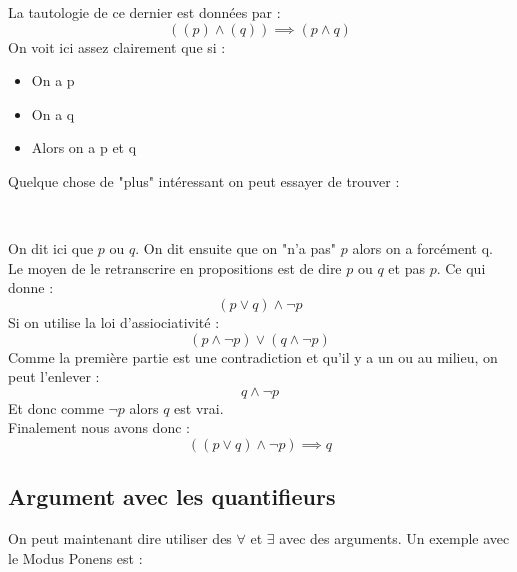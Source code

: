 La tautologie de ce dernier est données par :
\begin{equation*}
    ((p)\wedge(q)) \implies (p\wedge q)
\end{equation*}
On voit ici assez clairement que si :
\begin{itemize}
    \item On a p
    \item On a q
    \item Alors on a p et q
\end{itemize}

Quelque chose de "plus" intéressant on peut essayer de trouver :

\begin{deduction}
\end{deduction}
\\
\hspace{0.4cm}

On dit ici que $p$ ou $q$. On dit ensuite que on "n'a pas" $p$ alors on a forcément q. Le moyen de le retranscrire en propositions est de dire $p$ ou $q$ et pas $p$. Ce qui donne : 
\begin{equation*}
    (p \vee q) \wedge \neg p
\end{equation*}
Si on utilise la loi d'assiociativité :
\begin{equation*}
    (p \wedge \neg p) \vee (q \wedge \neg p)
\end{equation*}
Comme la première partie est une contradiction et qu'il y a un ou au milieu, on peut l'enlever :
\begin{equation*}
    q \wedge \neg p
\end{equation*} 
Et donc comme $\neg p$ alors $q$ est vrai.
\\
Finalement nous avons donc :
\begin{equation*}
    ((p\vee q) \wedge \neg p) \implies q
\end{equation*}


\subsection{Argument avec les quantifieurs}
On peut maintenant dire utiliser des $\forall$ et $\exists$ avec des arguments. Un exemple avec le Modus Ponens est :

\begin{deduction}
\end{deduction}
\hspace{0.4cm}
\\

